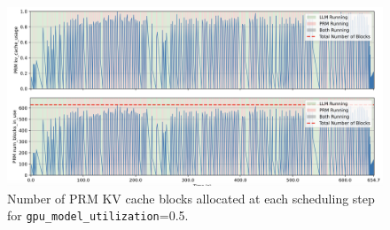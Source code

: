 \documentclass[12pt,twoside]{report}
\begin{document}
\begin{figure}[htbp]
  \centering
  \includegraphics[width=\textwidth]{figures/prm_block_usage_high.png}
  \caption{Number of PRM KV cache blocks allocated at each scheduling step for \texttt{gpu\_model\_utilization}=0.5.}
  \label{fig:prm_block_usage_high}
\end{figure}
\end{document}
